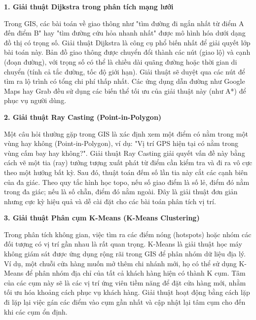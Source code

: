 \documentclass[a4paper,12pt]{article}
\begin{document}
\textbf{1. Giải thuật Dijkstra trong phân tích mạng lưới}

Trong GIS, các bài toán về giao thông như "tìm đường đi ngắn nhất từ điểm A đến điểm B" hay "tìm đường cứu hỏa nhanh nhất" được mô hình hóa dưới dạng đồ thị có trọng số. Giải thuật Dijkstra là công cụ phổ biến nhất để giải quyết lớp bài toán này. Bản đồ giao thông được chuyển đổi thành các nút (giao lộ) và cạnh (đoạn đường), với trọng số có thể là chiều dài quãng đường hoặc thời gian di chuyển (tính cả tắc đường, tốc độ giới hạn). Giải thuật sẽ duyệt qua các nút để tìm ra lộ trình có tổng chi phí thấp nhất. Các ứng dụng dẫn đường như Google Maps hay Grab đều sử dụng các biến thể tối ưu của giải thuật này (như A*) để phục vụ người dùng.

\textbf{2. Giải thuật Ray Casting (Point-in-Polygon)}

Một câu hỏi thường gặp trong GIS là xác định xem một điểm có nằm trong một vùng hay không (Point-in-Polygon), ví dụ: "Vị trí GPS hiện tại có nằm trong vùng cấm bay hay không?". Giải thuật Ray Casting giải quyết vấn đề này bằng cách vẽ một tia (ray) tưởng tượng xuất phát từ điểm cần kiểm tra và đi ra vô cực theo một hướng bất kỳ. Sau đó, thuật toán đếm số lần tia này cắt các cạnh biên của đa giác. Theo quy tắc hình học topo, nếu số giao điểm là số lẻ, điểm đó nằm trong đa giác; nếu là số chẵn, điểm đó nằm ngoài. Đây là giải thuật đơn giản nhưng cực kỳ hiệu quả và dễ cài đặt cho các bài toán phân tích vị trí.

\textbf{3. Giải thuật Phân cụm K-Means (K-Means Clustering)}

Trong phân tích không gian, việc tìm ra các điểm nóng (hotspots) hoặc nhóm các đối tượng có vị trí gần nhau là rất quan trọng. K-Means là giải thuật học máy không giám sát được ứng dụng rộng rãi trong GIS để phân nhóm dữ liệu địa lý. Ví dụ, một chuỗi cửa hàng muốn mở thêm chi nhánh mới, họ có thể sử dụng K-Means để phân nhóm địa chỉ của tất cả khách hàng hiện có thành K cụm. Tâm của các cụm này sẽ là các vị trí ứng viên tiềm năng để đặt cửa hàng mới, nhằm tối ưu hóa khoảng cách phục vụ khách hàng. Giải thuật hoạt động bằng cách lặp đi lặp lại việc gán các điểm vào cụm gần nhất và cập nhật lại tâm cụm cho đến khi các cụm ổn định.
\end{document}
